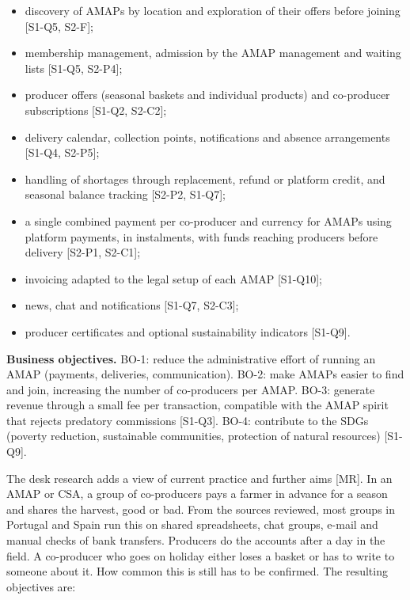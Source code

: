 \documentclass[11pt,a4paper]{article}
\begin{document}
\begin{itemize}
  \item discovery of AMAPs by location and exploration of their offers before joining [S1-Q5, S2-F];
  \item membership management, admission by the AMAP management and waiting lists [S1-Q5, S2-P4];
  \item producer offers (seasonal baskets and individual products) and co-producer subscriptions [S1-Q2, S2-C2];
  \item delivery calendar, collection points, notifications and absence arrangements [S1-Q4, S2-P5];
  \item handling of shortages through replacement, refund or platform credit, and seasonal balance tracking [S2-P2, S1-Q7];
  \item a single combined payment per co-producer and currency for AMAPs using platform payments, in instalments, with funds reaching producers before delivery [S2-P1, S2-C1];
  \item invoicing adapted to the legal setup of each AMAP [S1-Q10];
  \item news, chat and notifications [S1-Q7, S2-C3];
  \item producer certificates and optional sustainability indicators [S1-Q9].
\end{itemize}
\textbf{Business objectives.} BO-1: reduce the administrative effort of running an AMAP (payments, deliveries, communication). BO-2: make AMAPs easier to find and join, increasing the number of co-producers per AMAP. BO-3: generate revenue through a small fee per transaction, compatible with the AMAP spirit that rejects predatory commissions [S1-Q3]. BO-4: contribute to the SDGs (poverty reduction, sustainable communities, protection of natural resources) [S1-Q9].

The desk research adds a view of current practice and further aims [MR]. In an AMAP or CSA, a group of co-producers pays a farmer in advance for a season and shares the harvest, good or bad. From the sources reviewed, most groups in Portugal and Spain run this on shared spreadsheets, chat groups, e-mail and manual checks of bank transfers. Producers do the accounts after a day in the field. A co-producer who goes on holiday either loses a basket or has to write to someone about it. How common this is still has to be confirmed. The resulting objectives are:
\end{document}
